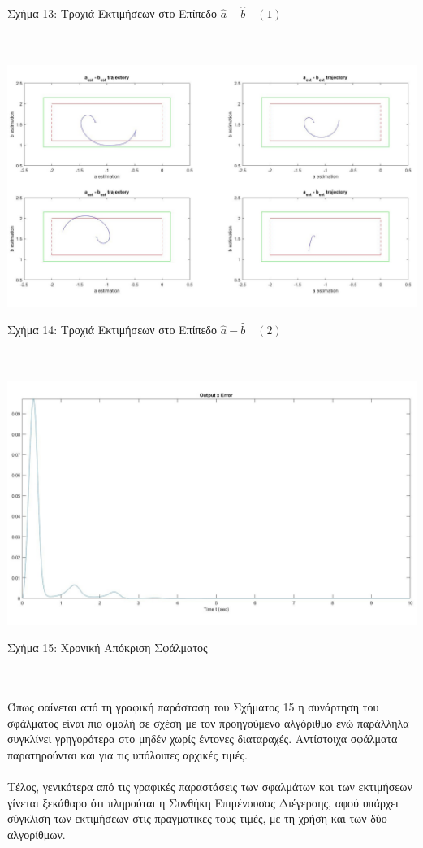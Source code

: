 \documentclass[12pt]{article}
\begin{document}
\centerline{Σχήμα 13: Τροχιά Εκτιμήσεων στο Επίπεδο $\hat{a} - \hat{b} \quad (1)$}
\\ \\
\includegraphics[width=\linewidth]{ab_est_b2.jpg}
\centerline{Σχήμα 14: Τροχιά Εκτιμήσεων στο Επίπεδο $\hat{a} - \hat{b} \quad (2)$}
\\ \\
\includegraphics[width=\linewidth]{errorB.jpg}
\centerline{Σχήμα 15:  Χρονική Απόκριση Σφάλματος}
\\ \\
Όπως φαίνεται από τη γραφική παράσταση του Σχήματος 15 η συνάρτηση του σφάλματος είναι πιο ομαλή σε σχέση με τον προηγούμενο αλγόριθμο ενώ παράλληλα συγκλίνει γρηγορότερα στο μηδέν χωρίς έντονες διαταραχές. Αντίστοιχα σφάλματα παρατηρούνται και για τις υπόλοιπες αρχικές τιμές.
\\ \\
Τέλος, γενικότερα από τις γραφικές παραστάσεις των σφαλμάτων και των εκτιμήσεων γίνεται ξεκάθαρο ότι πληρούται η Συνθήκη Επιμένουσας Διέγερσης, αφού υπάρχει σύγκλιση των εκτιμήσεων στις πραγματικές τους τιμές, με τη χρήση και των δύο αλγορίθμων.
\end{document}
